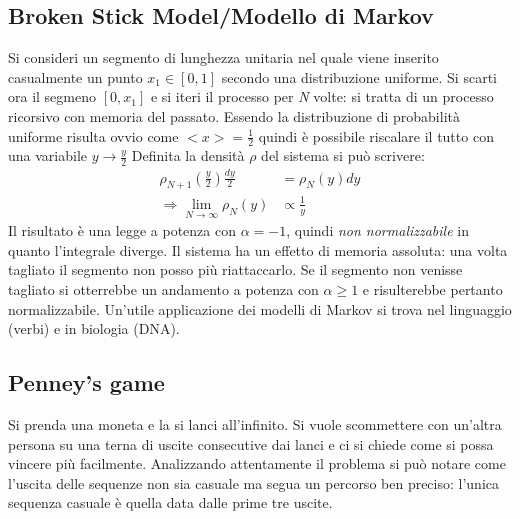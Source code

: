 \documentclass[12pt, a4paper]{article}
\theoremstyle{theorem}
\begin{document}
		\subsection{Broken Stick Model/Modello di Markov}
			Si consideri un segmento di lunghezza unitaria nel quale viene inserito casualmente un punto $x_1\in[0,1]$ secondo una distribuzione uniforme.
			Si scarti ora il segmeno $[0,x_1]$ e si iteri il processo per \textit{N} volte: si tratta di un processo ricorsivo con memoria del passato.
			Essendo la distribuzione di probabilità uniforme risulta ovvio come $<x>=\frac{1}{2}$ quindi è possibile riscalare il tutto con una variabile $y\rightarrow\frac{y}{2}$
			Definita la densità $\rho$ del sistema si può scrivere:
			\begin{equation}
				\begin{split}
					\rho_{N+1}\left(\frac{y}{2}\right)\frac{dy}{2}&=\rho_N(y)dy\\
					\Rightarrow\lim_{N\to\infty}\rho_N(y)&\propto\frac{1}{y}
				\end{split}
			\end{equation}
			Il risultato è una legge a potenza con $\alpha=-1$, quindi \textit{non normalizzabile} in quanto l'integrale diverge.
			Il sistema ha un effetto di memoria assoluta: una volta tagliato il segmento non posso più riattaccarlo.
			Se il segmento non venisse tagliato si otterrebbe un andamento a potenza con $\alpha\geq 1$ e risulterebbe pertanto normalizzabile.
			Un'utile applicazione dei modelli di Markov si trova nel linguaggio (verbi) e in biologia (DNA).
		\subsection{Penney's game}
			Si prenda una moneta e la si lanci all'infinito.
			Si vuole scommettere con un'altra persona su una terna di uscite consecutive dai lanci e ci si chiede come si possa vincere più facilmente.
			Analizzando attentamente il problema si può notare come l'uscita delle sequenze non sia casuale ma segua un percorso ben preciso: l'unica sequenza casuale è quella data dalle prime tre uscite.
						
\end{document}
